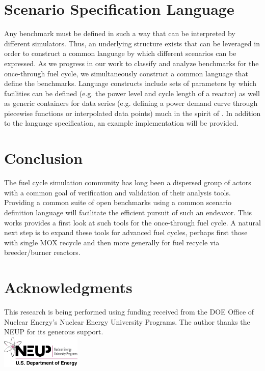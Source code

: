 \documentclass{anstrans}
\begin{document}
\section{Scenario Specification Language}
Any benchmark must be defined in such a way that can be interpreted by
different simulators. Thus, an underlying structure exists that can be
leveraged in order to construct a common language by which different
scenarios can be expressed. As we progress in our work to classify and
analyze benchmarks for the once-through fuel cycle, we simultaneously
construct a common language that define the benchmarks. Language 
constructs include sets of parameters by which facilities can be
defined (e.g. the power level and cycle length of a reactor) as well
as generic containers for data series (e.g. defining a power demand 
curve through piecewise functions or interpolated data points) much
in the spirit of \cite{mattoon_generalized_2012}. In addition to the
language specification, an example implementation will be provided.

\section{Conclusion}
The fuel cycle simulation community has long been a dispersed group of
actors with a common goal of verification and validation of their
analysis tools. Providing a common suite of open benchmarks using a
common scenario definition language will facilitate the efficient
pursuit of such an endeavor. This works provides a first look at such
tools for the once-through fuel cycle. A natural next step is to
expand these tools for advanced fuel cycles, perhaps first those with
single MOX recycle and then more generally for fuel recycle via
breeder/burner reactors.

\section{Acknowledgments}
This research is being performed using funding received from the DOE
Office of Nuclear Energy's Nuclear Energy University Programs.  The
author thanks the NEUP for its generous support.\\
\includegraphics[width=1.5in]{neup_logo_large.jpg}


\end{document}
